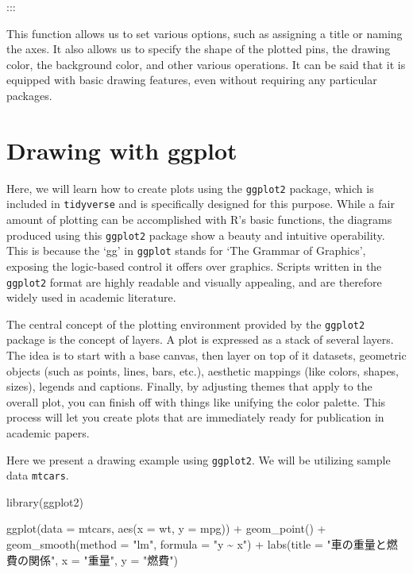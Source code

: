 \documentclass[
  a4paper,
]{book}
\newenvironment{Shaded}{\begin{snugshade}}{\end{snugshade}}
\newcommand{\AttributeTok}[1]{\textcolor[rgb]{0.40,0.45,0.13}{#1}}
\newcommand{\FunctionTok}[1]{\textcolor[rgb]{0.28,0.35,0.67}{#1}}
\newcommand{\NormalTok}[1]{\textcolor[rgb]{0.00,0.23,0.31}{#1}}
\newcommand{\SpecialCharTok}[1]{\textcolor[rgb]{0.37,0.37,0.37}{#1}}
\newcommand{\StringTok}[1]{\textcolor[rgb]{0.13,0.47,0.30}{#1}}
\begin{document}
:::

This function allows us to set various options, such as assigning a
title or naming the axes. It also allows us to specify the shape of the
plotted pins, the drawing color, the background color, and other various
operations. It can be said that it is equipped with basic drawing
features, even without requiring any particular packages.

\section{Drawing with ggplot}\label{drawing-with-ggplot}

Here, we will learn how to create plots using the \texttt{ggplot2}
package, which is included in \texttt{tidyverse} and is specifically
designed for this purpose. While a fair amount of plotting can be
accomplished with R's basic functions, the diagrams produced using this
\texttt{ggplot2} package show a beauty and intuitive operability. This
is because the `gg' in \texttt{ggplot} stands for `The Grammar of
Graphics', exposing the logic-based control it offers over graphics.
Scripts written in the \texttt{ggplot2} format are highly readable and
visually appealing, and are therefore widely used in academic
literature.

The central concept of the plotting environment provided by the
\texttt{ggplot2} package is the concept of layers. A plot is expressed
as a stack of several layers. The idea is to start with a base canvas,
then layer on top of it datasets, geometric objects (such as points,
lines, bars, etc.), aesthetic mappings (like colors, shapes, sizes),
legends and captions. Finally, by adjusting themes that apply to the
overall plot, you can finish off with things like unifying the color
palette. This process will let you create plots that are immediately
ready for publication in academic papers.

Here we present a drawing example using \texttt{ggplot2}. We will be
utilizing sample data \texttt{mtcars}.

\begin{Shaded}
\begin{Highlighting}[]
\FunctionTok{library}\NormalTok{(ggplot2)}

\FunctionTok{ggplot}\NormalTok{(}\AttributeTok{data =}\NormalTok{ mtcars, }\FunctionTok{aes}\NormalTok{(}\AttributeTok{x =}\NormalTok{ wt, }\AttributeTok{y =}\NormalTok{ mpg)) }\SpecialCharTok{+}
  \FunctionTok{geom\_point}\NormalTok{() }\SpecialCharTok{+}
  \FunctionTok{geom\_smooth}\NormalTok{(}\AttributeTok{method =} \StringTok{"lm"}\NormalTok{, }\AttributeTok{formula =} \StringTok{"y \textasciitilde{} x"}\NormalTok{) }\SpecialCharTok{+}
  \FunctionTok{labs}\NormalTok{(}\AttributeTok{title =} \StringTok{"車の重量と燃費の関係"}\NormalTok{, }\AttributeTok{x =} \StringTok{"重量"}\NormalTok{, }\AttributeTok{y =} \StringTok{"燃費"}\NormalTok{)}
\end{Highlighting}
\end{Shaded}
\end{document}
